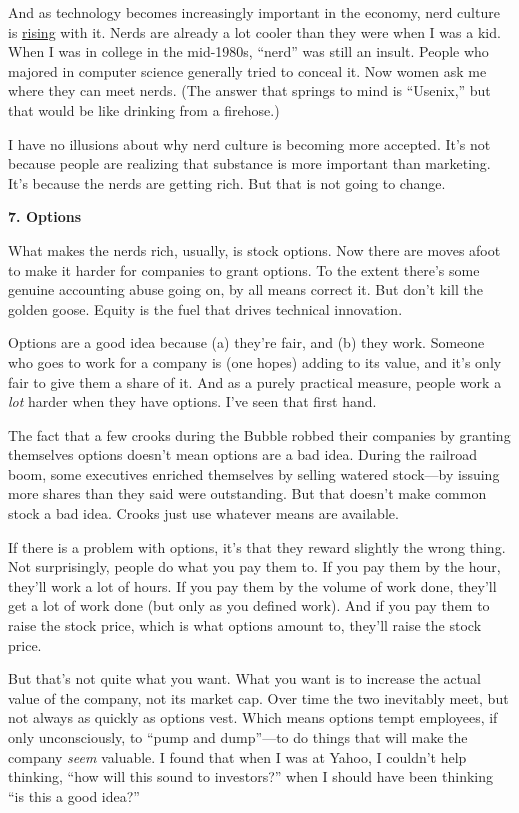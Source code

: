 And as technology becomes increasingly important in the economy, nerd
culture is \href{nerdad.html}{rising} with it. Nerds are already a lot
cooler than they were when I was a kid. When I was in college in the
mid-1980s, ``nerd'' was still an insult. People who majored in computer
science generally tried to conceal it. Now women ask me where they can
meet nerds. (The answer that springs to mind is ``Usenix,'' but that
would be like drinking from a firehose.)

I have no illusions about why nerd culture is becoming more accepted.
It's not because people are realizing that substance is more important
than marketing. It's because the nerds are getting rich. But that is not
going to change.

\textbf{7. Options}

What makes the nerds rich, usually, is stock options. Now there are
moves afoot to make it harder for companies to grant options. To the
extent there's some genuine accounting abuse going on, by all means
correct it. But don't kill the golden goose. Equity is the fuel that
drives technical innovation.

Options are a good idea because (a) they're fair, and (b) they work.
Someone who goes to work for a company is (one hopes) adding to its
value, and it's only fair to give them a share of it. And as a purely
practical measure, people work a \emph{lot} harder when they have
options. I've seen that first hand.

The fact that a few crooks during the Bubble robbed their companies by
granting themselves options doesn't mean options are a bad idea. During
the railroad boom, some executives enriched themselves by selling
watered stock---by issuing more shares than they said were outstanding.
But that doesn't make common stock a bad idea. Crooks just use whatever
means are available.

If there is a problem with options, it's that they reward slightly the
wrong thing. Not surprisingly, people do what you pay them to. If you
pay them by the hour, they'll work a lot of hours. If you pay them by
the volume of work done, they'll get a lot of work done (but only as you
defined work). And if you pay them to raise the stock price, which is
what options amount to, they'll raise the stock price.

But that's not quite what you want. What you want is to increase the
actual value of the company, not its market cap. Over time the two
inevitably meet, but not always as quickly as options vest. Which means
options tempt employees, if only unconsciously, to ``pump and
dump''---to do things that will make the company \emph{seem} valuable. I
found that when I was at Yahoo, I couldn't help thinking, ``how will
this sound to investors?'' when I should have been thinking ``is this a
good idea?''

